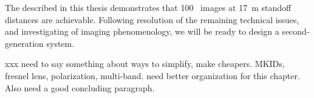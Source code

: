 The \Imager described in this thesis demonstrates that \SI{100}{\mK} \NETD\ images at \SI{17}{\m} standoff distances are achievable.
Following resolution of the remaining technical issues, and investigating of imaging phenomenology, we will be ready to design a second-generation system.

xxx need to say something about ways to simplify, make cheapers. MKIDs, fresnel lens, polarization, multi-band. need better organization for this chapter. Also need a good concluding paragraph.

